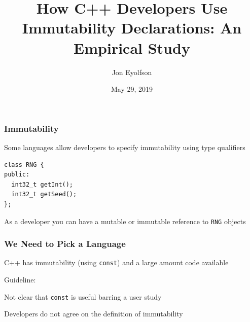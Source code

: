 \documentclass[aspectratio=169]{beamer}
\title{How C++ Developers Use Immutability Declarations: An Empirical Study}
\date{May 29, 2019}
\author{Jon Eyolfson}
\begin{document}
  \begin{frame}[plain]
    \titlepage
  \end{frame}

  \setcounter{framenumber}{0}

  \begin{frame}[fragile]
    \frametitle{Immutability}

    Some languages allow developers to specify immutability using type
    qualifiers
    \begin{lstlisting}[xleftmargin=1cm]
class RNG {
public:
  int32_t getInt();
  int32_t getSeed();
};
    \end{lstlisting}

    As a developer you can have a mutable or immutable reference to \texttt{RNG}
    objects

    \vspace{4em}

  \end{frame}

  \begin{frame}
    \frametitle{We Need to Pick a Language}

    C++ has immutability (using \texttt{const}) and a large amount code
    available

    \vspace{1em}

    \hspace{1em} Guideline: 

    \vspace{4em}

    Not clear that \texttt{const} is useful barring a user study

    \vspace{1em}

    \hspace{1em} Developers do not agree on the definition of immutability
  \end{frame}
\end{document}

